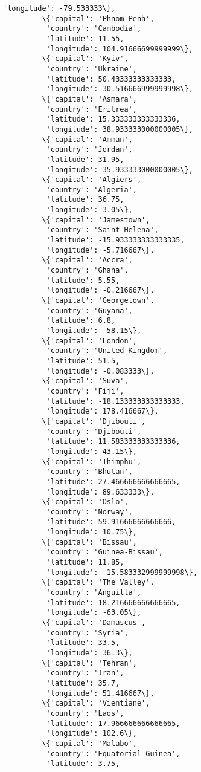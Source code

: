 \documentclass[11pt]{article}
\begin{document}
\begin{Verbatim}[commandchars=\\\{\}]
          'longitude': -79.533333\},
         \{'capital': 'Phnom Penh',
          'country': 'Cambodia',
          'latitude': 11.55,
          'longitude': 104.91666699999999\},
         \{'capital': 'Kyiv',
          'country': 'Ukraine',
          'latitude': 50.43333333333333,
          'longitude': 30.516666999999998\},
         \{'capital': 'Asmara',
          'country': 'Eritrea',
          'latitude': 15.333333333333336,
          'longitude': 38.933333000000005\},
         \{'capital': 'Amman',
          'country': 'Jordan',
          'latitude': 31.95,
          'longitude': 35.933333000000005\},
         \{'capital': 'Algiers',
          'country': 'Algeria',
          'latitude': 36.75,
          'longitude': 3.05\},
         \{'capital': 'Jamestown',
          'country': 'Saint Helena',
          'latitude': -15.933333333333335,
          'longitude': -5.716667\},
         \{'capital': 'Accra',
          'country': 'Ghana',
          'latitude': 5.55,
          'longitude': -0.216667\},
         \{'capital': 'Georgetown',
          'country': 'Guyana',
          'latitude': 6.8,
          'longitude': -58.15\},
         \{'capital': 'London',
          'country': 'United Kingdom',
          'latitude': 51.5,
          'longitude': -0.083333\},
         \{'capital': 'Suva',
          'country': 'Fiji',
          'latitude': -18.133333333333333,
          'longitude': 178.416667\},
         \{'capital': 'Djibouti',
          'country': 'Djibouti',
          'latitude': 11.583333333333336,
          'longitude': 43.15\},
         \{'capital': 'Thimphu',
          'country': 'Bhutan',
          'latitude': 27.466666666666665,
          'longitude': 89.633333\},
         \{'capital': 'Oslo',
          'country': 'Norway',
          'latitude': 59.91666666666666,
          'longitude': 10.75\},
         \{'capital': 'Bissau',
          'country': 'Guinea-Bissau',
          'latitude': 11.85,
          'longitude': -15.583332999999998\},
         \{'capital': 'The Valley',
          'country': 'Anguilla',
          'latitude': 18.216666666666665,
          'longitude': -63.05\},
         \{'capital': 'Damascus',
          'country': 'Syria',
          'latitude': 33.5,
          'longitude': 36.3\},
         \{'capital': 'Tehran',
          'country': 'Iran',
          'latitude': 35.7,
          'longitude': 51.416667\},
         \{'capital': 'Vientiane',
          'country': 'Laos',
          'latitude': 17.966666666666665,
          'longitude': 102.6\},
         \{'capital': 'Malabo',
          'country': 'Equatorial Guinea',
          'latitude': 3.75,

\end{Verbatim}
\end{document}

